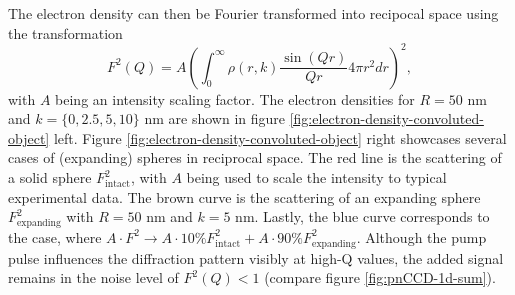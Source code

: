 The electron density can then be Fourier transformed into recipocal space using the transformation \citep{Guinier-1955-JWS}
\begin{equation}
F^{2}(Q)=A\left(\int_{0}^{\infty}\rho\left(r,k\right)\frac{\sin\left(Q r\right)}{Qr}4 \pi r^{2}dr\right)^{2},
\label{eq:guinier-fourier-transform}
\end{equation}
with $A$ being an intensity scaling factor. The electron densities for $R=50$ nm and $k=\{0,2.5,5,10\}$ nm are shown in figure \ref{fig:electron-density-convoluted-object} left. Figure \ref{fig:electron-density-convoluted-object} right showcases several cases of (expanding) spheres in reciprocal space. The red line is the scattering of a solid sphere $F_{\text{intact}}^{2}$, with $A$ being used to scale the intensity to typical experimental data. The brown curve is the scattering of an expanding sphere $F_{\text{expanding}}^{2}$ with $R=50$ nm and $k=5$ nm. Lastly, the blue curve corresponds to the case, where $A\cdot F^{2}\rightarrow A \cdot 10\% F_{\text{intact}}^{2}+A \cdot 90\% F_{\text{expanding}}^{2}$. Although the pump pulse influences the diffraction pattern visibly at high-Q values, the added signal remains in the noise level of $F^{2}(Q)<1$ (compare figure \ref{fig:pnCCD-1d-sum}).
%
%
%
